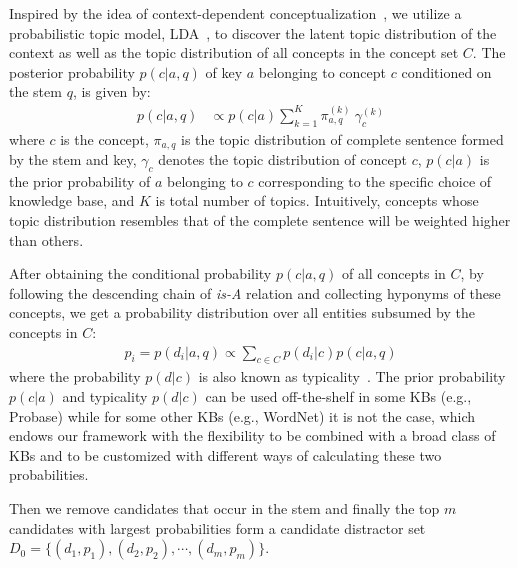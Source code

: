 Inspired by the idea of context-dependent conceptualization~\cite{kim2013context}, we utilize a probabilistic topic model, LDA~\cite{Blei:2003:LDA:944919.944937}, to discover the latent topic distribution of the context as well as the topic distribution of all concepts in the concept set $C$. The posterior probability $p(c|a, q)$
of key $a$ belonging to concept $c$ conditioned on the stem $q$, is given by: 
\begin{align}
	p(c|a, q) &\propto p(c|a) \sum_{k=1}^K \pi_{a,q}^{(k)} ~ \gamma_{c}^{(k)}
	\label{eq:pc}
\end{align}
where $c$ is the concept, $\pi_{a,q}$ is the topic distribution of complete sentence formed by the stem and key, $\gamma_{c}$ denotes the topic distribution of concept $c$, $p(c|a)$ is the prior probability of $a$ belonging to $c$ corresponding to the specific choice of knowledge base, 
and $K$ is total number of topics. 
Intuitively, concepts whose topic distribution resembles that of the complete sentence will be weighted higher than others.
	
After obtaining the conditional probability $p(c|a, q)$ of all concepts in 
$C$, by following the descending chain of \textit{is-A} relation and 
collecting hyponyms of these concepts, we get a probability distribution over 
all entities subsumed by the concepts in $C$:
\begin{align}	
	p_{i} = p(d_i|a,q) \propto \sum_{c\in C} p(d_i|c) p(c|a,q)
	\label{eq:pd}
\end{align}
where the probability $p(d|c)$ is also known as 
typicality~\cite{wu2012probase}. 
The prior probability $p(c|a)$ and typicality $p(d|c)$ can be used
off-the-shelf in some KBs (e.g., Probase) while for some other KBs
(e.g., WordNet) it is not the case, which endows our framework with 
the flexibility to be combined with a broad class of KBs and 
to be customized with different ways of calculating these two probabilities.

Then we remove candidates that occur in the stem and finally the top $m$ candidates with largest probabilities form a candidate distractor set $D_0 = \{(d_1, p_1), (d_2, p_2), \cdots,(d_m, p_m) \}$. 

